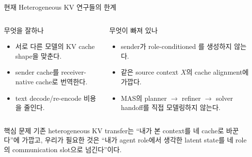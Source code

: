 \begin{frame}{현재 Heterogeneous KV 연구들의 한계}
\small
\begin{columns}[T,onlytextwidth]
\begin{block}{무엇을 잘하나}
\begin{itemize}
  \item 서로 다른 모델의 KV cache shape을 맞춘다.
  \item sender cache를 receiver-native cache로 번역한다.
  \item text decode/re-encode 비용을 줄인다.
\end{itemize}
\end{block}

\begin{block}{무엇이 빠져 있나}
\begin{itemize}
  \item sender가 role-conditioned 를 생성하지 않는다.
  \item 같은 source context \(X\)의 cache alignment에 가깝다.
  \item MAS의 planner \(\rightarrow\) refiner \(\rightarrow\) solver handoff를 직접 모델링하지 않는다.
\end{itemize}
\end{block}
\end{columns}

\vspace{0.8em}
\begin{center}
\end{center}

\vspace{0.5em}
\begin{block}{핵심 문제}
\small
기존 heterogeneous KV transfer는 ``내가 본 context를 네 cache로 바꾼다''에 가깝고,
우리가 필요한 것은 ``내가 agent role에서 생각한 latent state를 네 role의 communication slot으로 넘긴다''이다.
\end{block}
\end{frame}
